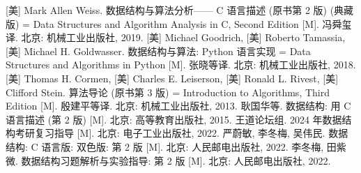 \documentclass[10pt,UTF8]{book} %
\begin{document}
\onecolumn
\begin{thebibliography}{1}
    [美] Mark Allen Weiss. 数据结构与算法分析—— C 语言描述 (原书第 2 版)
    (典藏版) = Data Structures and Algorithm Analysis in C,
    Second Edition [M]. 冯舜玺译. 北京: 机械工业出版社, 2019.
    [美] Michael Goodrich, [美] Roberto Tamassia, 
    [美] Michael H. Goldwasser. 数据结构与算法: Python 语言实现
    = Data Structures and Algorithms in Python [M].
    张晓等译. 北京: 机械工业出版社, 2018.
    [美] Thomas H. Cormen, [美] Charles E. Leiserson,
    [美] Ronald L. Rivest, [美] Clifford Stein.
    算法导论 (原书第 3 版) = Introduction to Algorithms, Third Edition [M].
    殷建平等译. 北京: 机械工业出版社, 2013.
    耿国华等. 数据结构: 用 C 语言描述 (第 2 版) [M].
    北京: 高等教育出版社, 2015.
    王道论坛组. 2024 年数据结构考研复习指导 [M]. 北京: 电子工业出版社, 2022.
    严蔚敏, 李冬梅, 吴伟民. 数据结构: C 语言版: 双色版: 第 2 版 [M].
    北京: 人民邮电出版社, 2022.
    李冬梅, 田紫微. 数据结构习题解析与实验指导: 第 2 版 [M]. 北京: 人民邮电出版社, 2022.
\end{thebibliography}



\end{document}
